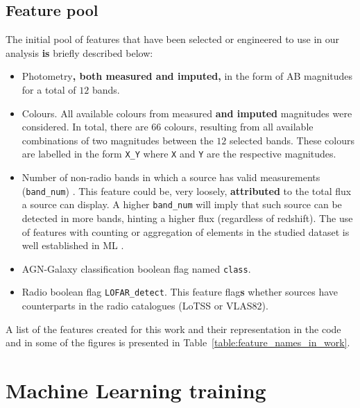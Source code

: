 \documentclass{aa}
\begin{document}
\subsection{Feature pool}\label{sec:feature_creation}

The initial pool of features that have been selected or engineered to use in our analysis \textbf{is} briefly described below:

\begin{itemize}
    \item Photometry\textbf{, both measured and imputed,} in the form of AB magnitudes for a total of $12$ bands.
    
    \item Colours. All available colours from measured \textbf{and imputed} magnitudes were considered. In total, there are $66$ colours, resulting from all available combinations of two magnitudes between the $12$ selected bands. These colours are labelled in the form \verb|X_Y| where \verb|X| and \verb|Y| are the respective magnitudes.

    \item Number of non-radio bands in which a source has valid measurements (\verb|band_num|) . This feature could be, very loosely, \textbf{attributed} to the total flux a source can display. A higher \verb|band_num| will imply that such source can be detected in more bands, hinting a higher flux (regardless of redshift). The use of features with counting or aggregation of elements in the studied dataset is well established in ML \citep[see, for example,][]{zheng2018feature, duboue2020art, 2021AJ....161..141S, 2022arXiv220913074H}.
    
    \item AGN-Galaxy classification boolean flag named \verb|class|.
    
    \item Radio boolean flag \verb|LOFAR_detect|. This feature flag\textbf{s} whether sources have counterparts in the radio catalogues (LoTSS or VLAS82).
\end{itemize}

A list of the features created for this work and their representation in the code and in some of the figures is presented in Table~\ref{table:feature_names_in_work}.

\section{Machine Learning training}\label{sec:ML_training}
\end{document}
